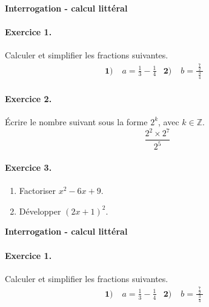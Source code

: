 \documentclass[11pt]{article}
\begin{document}

\begin{center}
  \textbf{\LARGE Interrogation - calcul littéral}
\end{center}

\paragraph{Exercice 1.} Calculer et simplifier les fractions suivantes.
\begin{align*}
  \textbf{1)}\;& a = \frac{1}{3}-\frac{1}{4} &
  \textbf{2)}\;& b = \frac{\;\frac{7}{2}\;}{\frac{3}{4}} &
\end{align*}

\paragraph{Exercice 2.} Écrire le nombre suivant sous la forme $2^k$, avec
$k\in\mathbb{Z}$.
\[
  \frac{2^2\times2^7}{2^5}
\]
\paragraph{Exercice 3.}
\begin{enumerate}
  \item Factoriser $x^2-6x+9$.
  \item Développer $(2x+1)^2$.
\end{enumerate}

\vspace{2cm}

\begin{center}
  \textbf{\LARGE Interrogation - calcul littéral}
\end{center}

\paragraph{Exercice 1.} Calculer et simplifier les fractions suivantes.
\begin{align*}
  \textbf{1)}\;& a = \frac{1}{3}-\frac{1}{4} &
  \textbf{2)}\;& b = \frac{\;\frac{7}{2}\;}{\frac{3}{4}} &
\end{align*}
\end{document}
